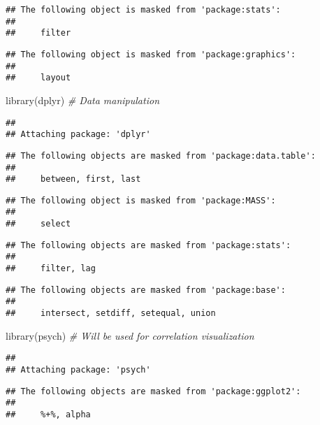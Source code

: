 \documentclass[
]{article}
\newenvironment{Shaded}{\begin{snugshade}}{\end{snugshade}}
\newcommand{\CommentTok}[1]{\textcolor[rgb]{0.56,0.35,0.01}{\textit{#1}}}
\newcommand{\FunctionTok}[1]{\textcolor[rgb]{0.00,0.00,0.00}{#1}}
\newcommand{\NormalTok}[1]{#1}
\begin{document}
\begin{verbatim}
## The following object is masked from 'package:stats':
## 
##     filter
\end{verbatim}

\begin{verbatim}
## The following object is masked from 'package:graphics':
## 
##     layout
\end{verbatim}

\begin{Shaded}
\begin{Highlighting}[]
\FunctionTok{library}\NormalTok{(dplyr) }\CommentTok{\# Data manipulation}
\end{Highlighting}
\end{Shaded}

\begin{verbatim}
## 
## Attaching package: 'dplyr'
\end{verbatim}

\begin{verbatim}
## The following objects are masked from 'package:data.table':
## 
##     between, first, last
\end{verbatim}

\begin{verbatim}
## The following object is masked from 'package:MASS':
## 
##     select
\end{verbatim}

\begin{verbatim}
## The following objects are masked from 'package:stats':
## 
##     filter, lag
\end{verbatim}

\begin{verbatim}
## The following objects are masked from 'package:base':
## 
##     intersect, setdiff, setequal, union
\end{verbatim}

\begin{Shaded}
\begin{Highlighting}[]
\FunctionTok{library}\NormalTok{(psych) }\CommentTok{\# Will be used for correlation visualization}
\end{Highlighting}
\end{Shaded}

\begin{verbatim}
## 
## Attaching package: 'psych'
\end{verbatim}

\begin{verbatim}
## The following objects are masked from 'package:ggplot2':
## 
##     %+%, alpha
\end{verbatim}
\end{document}

